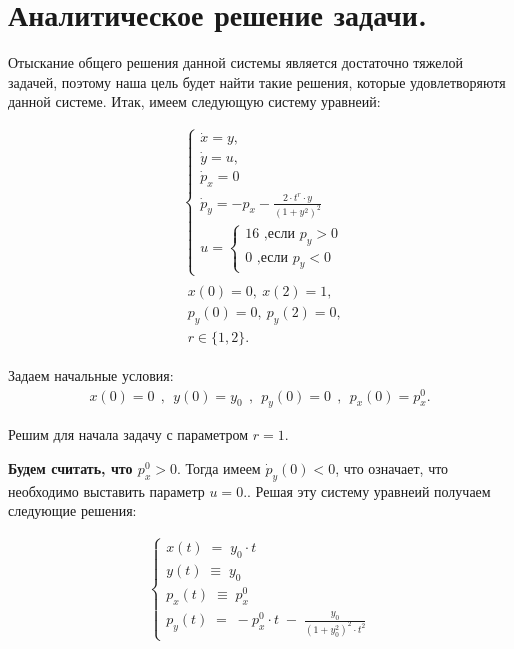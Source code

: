 \documentclass[a4paper,12pt]{article}
\begin{document}
\section{Аналитическое решение задачи.}

Отыскание общего решения данной системы является достаточно тяжелой задачей, поэтому наша цель будет найти такие решения, которые удовлетворяютя данной системе. Итак, имеем следующую систему уравнеий:

\begin{align*}
    &\left\{
        \begin{array}{l}
            \dot x =y,\\
            \dot y= u,\\
            \dot p_x= 0\\
            \dot p_y= -p_x -\frac{2\cdot t^r \cdot y}{{(1+y^2)}^2}\\
            u=\left\{
            \begin{array}{l}
                16 \text{ ,если } p_y>0 \\
                0 \text{ ,если } p_y<0
            \end{array}
            \right.
        \end{array}
    \right.
    \\
    &\begin{array}{l}
        x(0)=0, \: x(2)=1,\\
        p_y(0)=0, \: p_y(2)=0,\\
        r \in \{1, 2\}.
    \end{array}
\end{align*}

Задаем начальные условия:
\begin{align}
    x(0)=0\:\:,\:\:y(0)=y_0\:\:,\:\:p_y(0)=0\:\:,\:\:p_x(0)=p_x^0.
\end{align}

Решим для начала задачу с параметром $r=1.$

\textbf{Будем считать, что $p_x^0 > 0.$} Тогда имеем $\dot p_y(0)<0$, что означает, что необходимо выставить параметр $u=0.$. Решая эту систему уравнеий получаем следующие решения:

\begin{align*}
    \left\{
        \begin{array}{l}
            x(t)\;=\; y_0\cdot t\\
            y(t)\; \equiv \; y_0\\
            p_x(t)\;\equiv \; p_x^0\\
            p_y(t)\; =\; -p_x^0\cdot t\;-\;\frac{y_0}{(1+y_0^2)^2\cdot t^2}
        \end{array}
    \right.
\end{align*}
\end{document}
